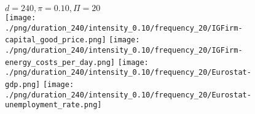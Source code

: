 \begin{figure}[ht!]
\centering\leavevmode
\begin{minipage}{13cm}
\centering\leavevmode
{$d=240, \pi=0.10, \Pi=20$}\\
\texttt{[image: ./png/duration\_240/intensity\_0.10/frequency\_20/IGFirm-capital\_good\_price.png]}
\texttt{[image: ./png/duration\_240/intensity\_0.10/frequency\_20/IGFirm-energy\_costs\_per\_day.png]}
\texttt{[image: ./png/duration\_240/intensity\_0.10/frequency\_20/Eurostat-gdp.png]}
\texttt{[image: ./png/duration\_240/intensity\_0.10/frequency\_20/Eurostat-unemployment\_rate.png]}
\end{minipage}
\end{figure}

